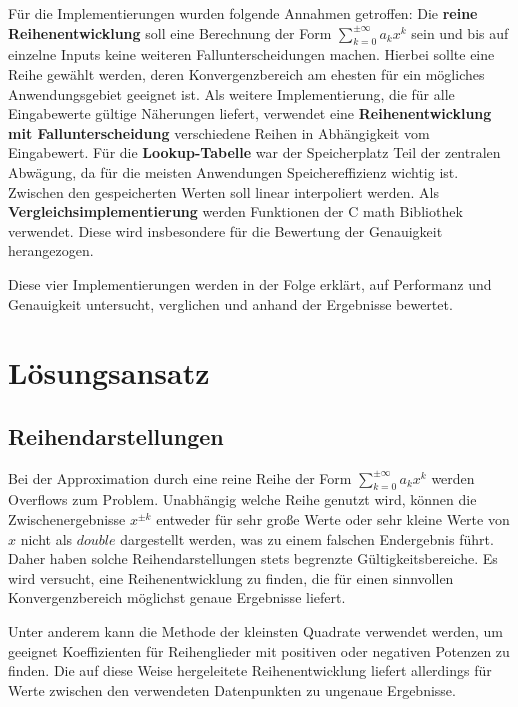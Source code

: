 \documentclass[course=erap] {aspdoc}
\begin{document}
    Für die Implementierungen wurden folgende Annahmen getroffen:
    Die \textbf{reine Reihenentwicklung} soll eine Berechnung der Form $\sum_{k=0}^{\pm\infty} a_k x^k$ sein und bis auf einzelne Inputs keine weiteren Fallunterscheidungen machen.
    Hierbei sollte eine Reihe gewählt werden, deren Konvergenzbereich am ehesten für ein mögliches Anwendungsgebiet geeignet ist.
    Als weitere Implementierung, die für alle Eingabewerte gültige Näherungen liefert, verwendet eine \textbf{Reihenentwicklung mit Fallunterscheidung} verschiedene Reihen in Abhängigkeit vom Eingabewert.
    Für die \textbf{Lookup-Tabelle} war der Speicherplatz Teil der zentralen Abwägung, da für die meisten Anwendungen Speichereffizienz wichtig ist.
    Zwischen den gespeicherten Werten soll linear interpoliert werden.
    Als \textbf{Vergleichsimplementierung} werden Funktionen der C math Bibliothek verwendet.
    Diese wird insbesondere für die Bewertung der Genauigkeit herangezogen.

    Diese vier Implementierungen werden in der Folge erklärt, auf Performanz und Genauigkeit untersucht, verglichen und anhand der Ergebnisse bewertet.


    \section{Lösungsansatz}\label{sec:losungsansatz}

    \subsection{Reihendarstellungen}\label{subsec:reihendarstellung}

    Bei der Approximation durch eine reine Reihe der Form $\sum_{k=0}^{\pm\infty} a_k x^k$ werden Overflows zum Problem.
    Unabhängig welche Reihe genutzt wird, können die Zwischenergebnisse $x^{\pm k}$ entweder für sehr große Werte oder sehr kleine Werte von $x$ nicht als $double$ dargestellt werden, was zu einem falschen Endergebnis führt.
    Daher haben solche Reihendarstellungen stets begrenzte Gültigkeitsbereiche.
    Es wird versucht, eine Reihenentwicklung zu finden, die für einen sinnvollen Konvergenzbereich möglichst genaue Ergebnisse liefert.

    Unter anderem kann die Methode der kleinsten Quadrate verwendet werden, um geeignet Koeffizienten für Reihenglieder mit positiven oder negativen Potenzen zu finden.
    Die auf diese Weise hergeleitete Reihenentwicklung liefert allerdings für Werte zwischen den verwendeten Datenpunkten zu ungenaue Ergebnisse.
\end{document}
